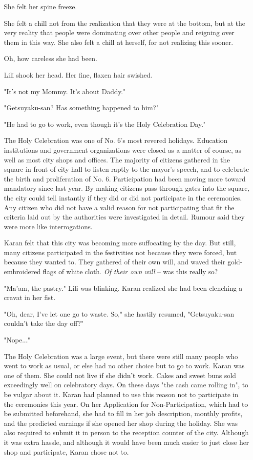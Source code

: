 She felt her spine freeze.

She felt a chill not from the realization that they were at the bottom,
but at the very reality that people were dominating over other people
and reigning over them in this way. She also felt a chill at herself,
for not realizing this sooner.

Oh, how careless she had been.

Lili shook her head. Her fine, flaxen hair swished.

"It's not my Mommy. It's about Daddy."

"Getsuyaku-san? Has something happened to him?"

"He had to go to work, even though it's the Holy Celebration Day."

The Holy Celebration was one of No. 6's most revered holidays. Education
institutions and government organizations were closed as a matter of
course, as well as most city shops and offices. The majority of citizens
gathered in the square in front of city hall to listen raptly to the
mayor's speech, and to celebrate the birth and proliferation of No. 6.
Participation had been moving more toward mandatory since last year. By
making citizens pass through gates into the square, the city could tell
instantly if they did or did not participate in the ceremonies. Any
citizen who did not have a valid reason for not participating that fit
the criteria laid out by the authorities were investigated in detail.
Rumour said they were more like interrogations.

Karan felt that this city was becoming more suffocating by the day. But
still, many citizens participated in the festivities not because they
were forced, but because they wanted to. They gathered of their own
will, and waved their gold-embroidered flags of white cloth. \emph{Of their
	own will} -- was this really so?

"Ma'am, the pastry." Lili was blinking. Karan realized she had been
clenching a cravat in her fist.

"Oh, dear, I've let one go to waste. So," she hastily resumed,
"Getsuyaku-san couldn't take the day off?"

"Nope..."

The Holy Celebration was a large event, but there were still many people
who went to work as usual, or else had no other choice but to go to
work. Karan was one of them. She could not live if she didn't work.
Cakes and sweet buns sold exceedingly well on celebratory days. On these
days "the cash came rolling in", to be vulgar about it. Karan had
planned to use this reason not to participate in the ceremonies this
year. On her Application for Non-Participation, which had to be
submitted beforehand, she had to fill in her job description, monthly
profits, and the predicted earnings if she opened her shop during the
holiday. She was also required to submit it in person to the reception
counter of the city. Although it was extra hassle, and although it would
have been much easier to just close her shop and participate, Karan
chose not to.

